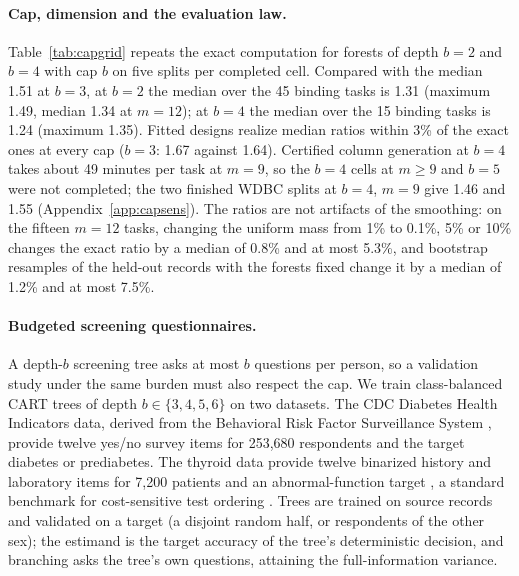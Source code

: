 \paragraph{Cap, dimension and the evaluation law.}
Table~\ref{tab:capgrid} repeats the exact computation for forests of depth $b=2$ and $b=4$ with cap $b$ on five splits per completed cell. Compared with the median 1.51 at $b=3$, at $b=2$ the median over the 45 binding tasks is 1.31 (maximum 1.49, median 1.34 at $m=12$); at $b=4$ the median over the 15 binding tasks is 1.24 (maximum 1.35). Fitted designs realize median ratios within 3\% of the exact ones at every cap ($b=3$: 1.67 against 1.64). Certified column generation at $b=4$ takes about 49 minutes per task at $m=9$, so the $b=4$ cells at $m\ge9$ and $b=5$ were not completed; the two finished WDBC splits at $b=4$, $m=9$ give 1.46 and 1.55 (Appendix~\ref{app:capsens}). The ratios are not artifacts of the smoothing: on the fifteen $m=12$ tasks, changing the uniform mass from 1\% to 0.1\%, 5\% or 10\% changes the exact ratio by a median of 0.8\% and at most 5.3\%, and bootstrap resamples of the held-out records with the forests fixed change it by a median of 1.2\% and at most 7.5\%.



\paragraph{Budgeted screening questionnaires.}
A depth-$b$ screening tree asks at most $b$ questions per person, so a validation study under the same burden must also respect the cap. We train class-balanced CART trees of depth $b\in\{3,4,5,6\}$ on two datasets. The CDC Diabetes Health Indicators data, derived from the Behavioral Risk Factor Surveillance System \citep{cdcdiabetes2017}, provide twelve yes/no survey items for 253,680 respondents and the target diabetes or prediabetes. The thyroid data provide twelve binarized history and laboratory items for 7,200 patients and an abnormal-function target \citep{quinlan1986thyroid}, a standard benchmark for cost-sensitive test ordering \citep{turney1995}. Trees are trained on source records and validated on a target (a disjoint random half, or respondents of the other sex); the estimand is the target accuracy of the tree's deterministic decision, and branching asks the tree's own questions, attaining the full-information variance.



